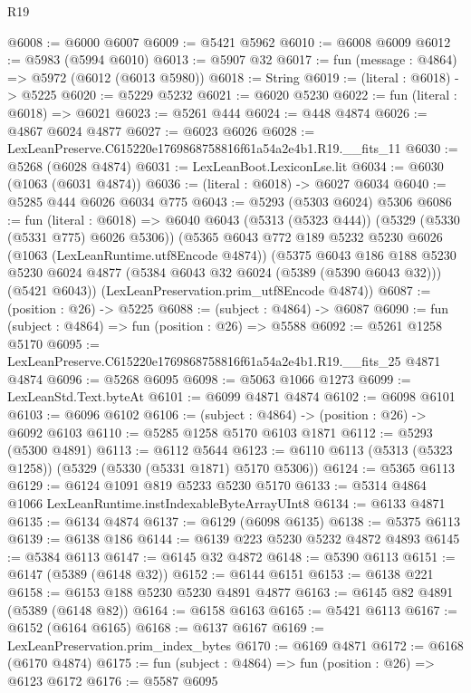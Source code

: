 \begin{lexlean}{R19}
\begin{coremodule}
@6008 := @6000 @6007
@6009 := @5421 @5962
@6010 := @6008 @6009
@6012 := @5983 (@5994 @6010)
@6013 := @5907 @32
@6017 := fun (message : @4864) => @5972 (@6012 (@6013 @5980))
@6018 := String
@6019 := (literal : @6018) -> @5225
@6020 := @5229 @5232
@6021 := @6020 @5230
@6022 := fun (literal : @6018) => @6021
@6023 := @5261 @444
@6024 := @448 @4874
@6026 := @4867 @6024 @4877
@6027 := @6023 @6026
@6028 := LexLeanPreserve.C615220e1769868758816f61a54a2e4b1.R19.__fits_11
@6030 := @5268 (@6028 @4874)
@6031 := LexLeanBoot.LexiconLse.lit
@6034 := @6030 (@1063 (@6031 @4874))
@6036 := (literal : @6018) -> @6027 @6034
@6040 := @5285 @444 @6026 @6034 @775
@6043 := @5293 (@5303 @6024) @5306
@6086 := fun (literal : @6018) =>
  @6040
    @6043
    (@5313 (@5323 @444))
    (@5329 (@5330 (@5331 @775) @6026 @5306))
    (@5365
      @6043
      @772
      @189
      @5232
      @5230
      @6026
      (@1063 (LexLeanRuntime.utf8Encode @4874))
      (@5375
        @6043
        @186
        @188
        @5230
        @5230
        @6024
        @4877
        (@5384 @6043 @32 @6024 (@5389 (@5390 @6043 @32)))
        (@5421 @6043))
      (LexLeanPreservation.prim_utf8Encode @4874))
@6087 := (position : @26) -> @5225
@6088 := (subject : @4864) -> @6087
@6090 := fun (subject : @4864) => fun (position : @26) => @5588
@6092 := @5261 @1258 @5170
@6095 := LexLeanPreserve.C615220e1769868758816f61a54a2e4b1.R19.__fits_25 @4871 @4874
@6096 := @5268 @6095
@6098 := @5063 @1066 @1273
@6099 := LexLeanStd.Text.byteAt
@6101 := @6099 @4871 @4874
@6102 := @6098 @6101
@6103 := @6096 @6102
@6106 := (subject : @4864) -> (position : @26) -> @6092 @6103
@6110 := @5285 @1258 @5170 @6103 @1871
@6112 := @5293 (@5300 @4891)
@6113 := @6112 @5644
@6123 := @6110 @6113 (@5313 (@5323 @1258)) (@5329 (@5330 (@5331 @1871) @5170 @5306))
@6124 := @5365 @6113
@6129 := @6124 @1091 @819 @5233 @5230 @5170
@6133 := @5314 @4864 @1066 LexLeanRuntime.instIndexableByteArrayUInt8
@6134 := @6133 @4871
@6135 := @6134 @4874
@6137 := @6129 (@6098 @6135)
@6138 := @5375 @6113
@6139 := @6138 @186
@6144 := @6139 @223 @5230 @5232 @4872 @4893
@6145 := @5384 @6113
@6147 := @6145 @32 @4872
@6148 := @5390 @6113
@6151 := @6147 (@5389 (@6148 @32))
@6152 := @6144 @6151
@6153 := @6138 @221
@6158 := @6153 @188 @5230 @5230 @4891 @4877
@6163 := @6145 @82 @4891 (@5389 (@6148 @82))
@6164 := @6158 @6163
@6165 := @5421 @6113
@6167 := @6152 (@6164 @6165)
@6168 := @6137 @6167
@6169 := LexLeanPreservation.prim_index_bytes
@6170 := @6169 @4871
@6172 := @6168 (@6170 @4874)
@6175 := fun (subject : @4864) => fun (position : @26) => @6123 @6172
@6176 := @5587 @6095

\end{coremodule}
\end{lexlean}
